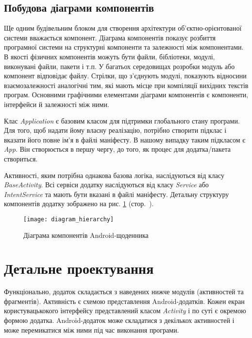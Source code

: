\documentclass[../main.tex]{subfiles}
\begin{document}
\subsection{Побудова діаграми компонентів}
Ще одним будівельним блоком для створення архітектури об'єктно-\linebreak[0]орієнтованої системи вважається компонент. Діаграма компонентів показує розбиття програмної системи на структурні компоненти та залежності між компонентами. В якості фізичних компонентів можуть бути файли, бібліотеки, модулі, виконувані файли, пакети і т.п. У багатьох середовищах розробки модуль або компонент відповідає файлу. Стрілки, що з'єднують модулі, показують відносини взаємозалежності аналогічні тим, які мають місце при компіляції вихідних текстів програм. Основними графічними елементами діаграми компонентів є компоненти, інтерфейси й залежності між ними. 

Клас \textit{Application} є базовим класом для підтримки глобального стану програми. Для того, щоб надати йому власну реалізацію, потрібно створити підклас і вказати його повне ім'я в файлі маніфесту. В нашому випадку таким підкласом є \textit{App}. Він створюється в першу чергу, до того, як процес для додатка/пакета створиться.

Активності, яким потрібна однакова базова логіка, наслідуються від класу \textit{BaseActivity}. Всі сервіси додатку наслідуються від класу \textit{Service} або \textit{IntentService} та мають бути вказані в файлі маніфесту. Детальну структуру компонентів додатку зображено на рис. \ref{diagram:hierarchy} (стор.~\pageref{diagram:hierarchy}).

\begin{figure}[p]
	\centering
	\texttt{[image: diagram\_hierarchy]}
	\caption{Діаграма компонентів Android-щоденника}
	\label{diagram:hierarchy}
\end{figure}

\section{Детальне проектування}

Функціонально, додаток складається з наведених нижче модулів (активностей та фрагментів). Активність є схемою представлення Android-додатків. Кожен екран користувацькокого інтерфейсу представлений класом \textit{Activity} і по суті є окремою формою додатка. Android-додаток може складатися з декількох активностей і може перемикатися між ними під час виконання програми. 
\end{document}
